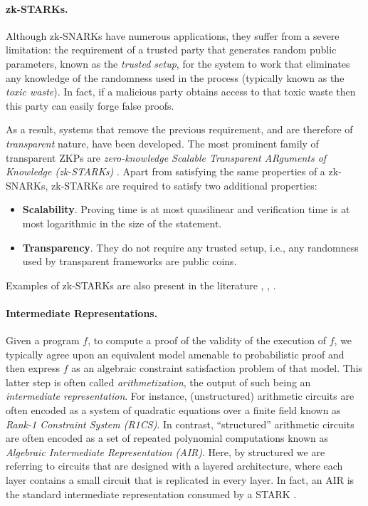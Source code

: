 \paragraph*{zk-STARKs.}
Although zk-SNARKs have numerous applications, they suffer from a severe limitation: the requirement of a trusted party that generates random public parameters, known as the \textit{trusted setup}, for the system to work that eliminates any knowledge of the randomness used in the process (typically known as the \textit{toxic waste}). In fact, if a malicious party obtains access to that toxic waste then this party can easily forge false proofs.

As a result, systems that remove the previous requirement, and are therefore of \textit{transparent} nature, have been developed. The most prominent family of transparent ZKPs are \textit{zero-knowledge Scalable Transparent ARguments of Knowledge (zk-STARKs)} \cite{EPRINT:BBHR18}. Apart from satisfying the same properties of a zk-SNARKs, zk-STARKs are required to satisfy two additional properties:
\begin{itemize}
	\item \textbf{Scalability}. Proving time is at most quasilinear and verification time is at most logarithmic in the size of the statement. 

	\item \textbf{Transparency}. They do not require any trusted setup, i.e., any randomness used by transparent frameworks are public coins.
\end{itemize}

Examples of zk-STARKs are also present in the literature \cite{EPRINT:WTsTW17}, \cite{EPRINT:ChiOjhSpo19}, \cite{EPRINT:Setty19}.

\paragraph*{Intermediate Representations.}
Given a program $f$, to compute a proof of the validity of the execution of $f$, we typically agree upon an equivalent model amenable to probabilistic proof and then express $f$ as an algebraic constraint satisfaction problem of that model. This latter step is often called \textit{arithmetization}, the output of such being an \textit{intermediate representation}. For instance, (unstructured) arithmetic circuits are often encoded as a system of quadratic equations over a finite field known as \textit{Rank-1 Constraint System (R1CS)}. In contrast, ``structured'' arithmetic circuits are often encoded as a set of repeated polynomial computations known as \textit{Algebraic Intermediate Representation (AIR)}. Here, by structured we are referring to circuits that are designed with a layered architecture, where each layer contains a small circuit that is replicated in every layer. In fact, an AIR is the standard intermediate representation consumed by a STARK \cite{EPRINT:StarkWare21}.

